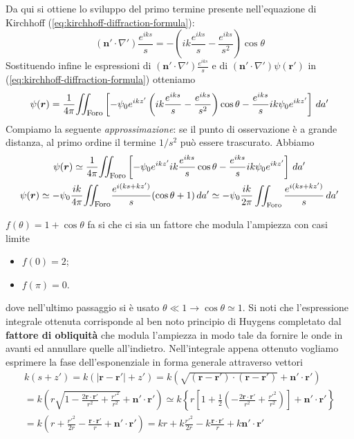 Da qui si ottiene lo sviluppo del primo termine presente nell'equazione di Kirchhoff (\ref{eq:kirchhoff-diffraction-formula}):
\[
	(\bm{n}' \cdot \nabla')\frac{e^{iks}}{s} = -\left(ik\frac{e^{iks}}{s}-\frac{e^{iks}}{s^2}\right) \cos \theta
\]
Sostituendo infine le espressioni di $(\bm{n}' \cdot \nabla ') \frac{e^{iks}}{s}$ e di
$(\bm{n}' \cdot \nabla')\psi(\bm{r'})$ in (\ref{eq:kirchhoff-diffraction-formula}) otteniamo
\[
	\psi(\bm{r}) = \frac{1}{4 \pi} \mathlarger{\iint_{\text{Foro}}} \left[-\psi_0 e^{ikz'}\left( ik\frac{e^{iks}}{s}-\frac{e^{iks}}{s^2}\right) \cos \theta - \frac{e^{iks}}{s} ik\psi_0 e^{ikz'} \right] \, da'
\]
Compiamo la seguente \emph{approssimazione}: se il punto di osservazione
è a grande distanza, al primo ordine il termine \(1/s^2\) può essere
trascurato.
Abbiamo
\begin{gather*}
	\psi(\bm{r}) \simeq \frac{1}{4 \pi} \mathlarger{\iint_{\text{Foro}}} \left[-\psi_0 e^{ikz'} ik\frac{e^{iks}}{s}
	\cos \theta - \frac{e^{iks}}{s}ik\psi_0 e^{ikz'} \right]\, da'\\
	\psi(\bm{r}) \simeq -\psi_0 \frac{ik}{4 \pi} \mathlarger{\iint_{\text{Foro}}} \frac{e^{i(ks+kz')}}{s}(\cos \theta + 1)\,
	da' \simeq -\psi_0 \frac{ik}{2 \pi} \iint_{\text{Foro}} \frac{e^{i(ks+kz')}}{s}\,da'
\end{gather*}
\marginnote
{ $f(\theta) = 1 + \cos \theta$ fa si che ci sia un fattore che modula l'ampiezza con casi limite
	\begin{itemize}
		\item $f(0) = 2$;
		\item $f(\pi) = 0$.
	\end{itemize}
}
dove nell'ultimo passaggio si è usato
\(\theta \ll 1 \rightarrow \cos \theta \simeq 1\).
Si noti che
l'espressione integrale ottenuta corrisponde al ben noto principio di
Huygens completato dal \textbf{fattore di obliquità} che modula
l'ampiezza in modo tale da fornire le onde in avanti ed annullare quelle
all'indietro.
Nell'integrale appena ottenuto vogliamo esprimere la fase dell'esponenziale in forma generale attraverso vettori
\begin{gather*}
	k(s + z') = k(|\bm{r}-\bm{r'}|+z') = k \left(\sqrt{(\bm{r}-\bm{r'})\cdot(\bm{r}-\bm{r'})}+\bm{n}' \cdot \bm{r'}\right)\\
	= k\left(r \sqrt{1 - \frac{2 \bm{r}\cdot \bm{r'}}{r^2} + \frac{r'^2}{r^2}} + \bm{n}' \cdot \bm{r'}\right)
	\simeq k \left\{ r  \left[ 1 + \frac{1}{2} \left( - \frac{2 \bm{r}\cdot \bm{r'}}{r^2} + \frac{r'^2}{r^2}\right) \right]
	+ \bm{n}' \cdot \bm{r'} \right\} \\
	=  k\left( r + \frac{r'^2}{2r} - \frac{ \bm{r}\cdot \bm{r'}}{r} + \bm{n}' \cdot \bm{r'}\right)
	= k r + k \frac{r'^2}{2r} - k \frac{ \bm{r}\cdot \bm{r'}}{r} + k \bm{n}' \cdot \bm{r'}
\end{gather*}
